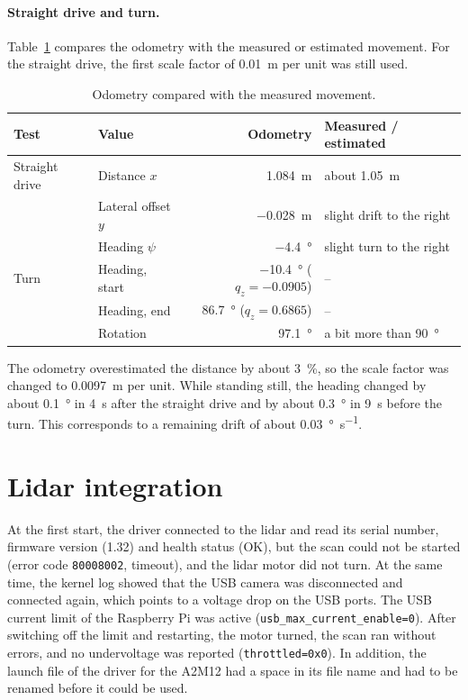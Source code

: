 \paragraph{Straight drive and turn.} Table~\ref{tab:validation} compares the odometry with the measured or estimated movement. For the straight drive, the first scale factor of \SI{0.01}{\metre} per unit was still used.

\begin{table}[H]
  \centering
  \small
  \caption{Odometry compared with the measured movement.}
  \label{tab:validation}
  \begin{tabular}{@{}l l r l@{}}
    \toprule
    \textbf{Test} & \textbf{Value} & \textbf{Odometry} & \textbf{Measured / estimated} \\
    \midrule
    Straight drive & Distance $x$       & \SI{1.084}{\metre}  & about \SI{1.05}{\metre} \\
                   & Lateral offset $y$ & \SI{-0.028}{\metre} & slight drift to the right \\
                   & Heading $\psi$     & \SI{-4.4}{\degree}  & slight turn to the right \\
    \midrule
    Turn           & Heading, start     & \SI{-10.4}{\degree} ($q_z = -0.0905$) & -- \\
                   & Heading, end       & \SI{86.7}{\degree} ($q_z = 0.6865$)  & -- \\
                   & Rotation           & \SI{97.1}{\degree}  & a bit more than \SI{90}{\degree} \\
    \bottomrule
  \end{tabular}
\end{table}

The odometry overestimated the distance by about \SI{3}{\percent}, so the scale factor was changed to \SI{0.0097}{\metre} per unit. While standing still, the heading changed by about \SI{0.1}{\degree} in \SI{4}{\second} after the straight drive and by about \SI{0.3}{\degree} in \SI{9}{\second} before the turn. This corresponds to a remaining drift of about \SI{0.03}{\degree\per\second}.

\section{Lidar integration}
\label{sec:lidar_results}

At the first start, the driver connected to the lidar and read its serial number, firmware version (1.32) and health status (OK), but the scan could not be started (error code \texttt{80008002}, timeout), and the lidar motor did not turn. At the same time, the kernel log showed that the USB camera was disconnected and connected again, which points to a voltage drop on the USB ports. The USB current limit of the Raspberry Pi was active (\texttt{usb\_max\_current\_enable=0}). After switching off the limit and restarting, the motor turned, the scan ran without errors, and no undervoltage was reported (\texttt{throttled=0x0}). In addition, the launch file of the driver for the A2M12 had a space in its file name and had to be renamed before it could be used.


